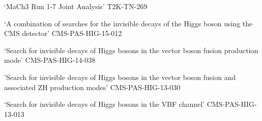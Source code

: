 \documentclass[12pt]{article}   %
\begin{document}
`MaCh3 Run 1-7 Joint Analysis' T2K-TN-269

`A combination of searches for the invisible decays of the Higgs boson using the CMS detector' CMS-PAS-HIG-15-012

`Search for invisible decays of Higgs bosons in the vector boson fusion production mode' CMS-PAS-HIG-14-038

'Search for invisible decays of Higgs bosons in the vector boson fusion and associated ZH production modes' CMS-PAS-HIG-13-030

`Search for invisible decays of Higgs bosons in the VBF channel' CMS-PAS-HIG-13-013



   \nocite{*}                   %

\end{document}
